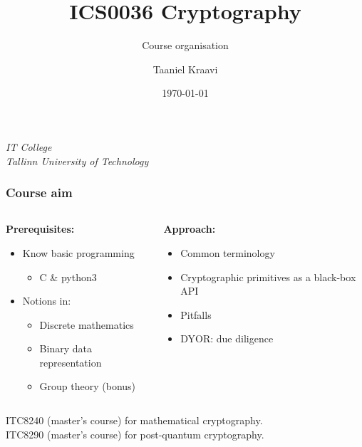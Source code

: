 \title{ICS0036 Cryptography}
\subtitle{Course organisation}
\date{\today}
\author{Taaniel Kraavi}
\institute%
{%
  \textit{IT College}\\
  \textit{Tallinn University of Technology}
}


\begin{frame}
  \titlepage
\end{frame}

\begin{frame}
  \frametitle{Course aim}

  \begin{columns}[T]
    \begin{column}{.5\textwidth}
      \textbf{Prerequisites:}
      \begin{itemize}[<+->]
        \pause
        \item Know basic programming
        \begin{itemize}
          \item C \& python3
        \end{itemize}
        \item Notions in:
        \begin{itemize}
          \item Discrete mathematics
          \item Binary data representation
          \item Group theory (bonus)
        \end{itemize}
      \end{itemize}
    \end{column}

    \pause
    \begin{column}{.4\textwidth}
      \textbf{Approach:}
      \begin{itemize}[<+->]
        \item Common terminology
        \item Cryptographic primitives as a black-box API
        \item Pitfalls
        \item DYOR: due diligence
      \end{itemize}
    \end{column}
  \end{columns}

  \vspace*{2em}

  \pause
  ITC8240 (master's course) for mathematical cryptography.\\
  \pause
  ITC8290 (master's course) for post-quantum cryptography.
\end{frame}

